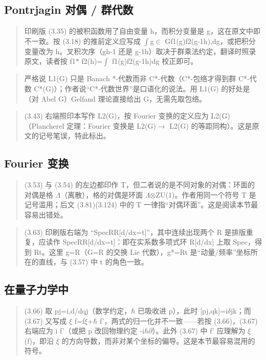 \subsection*{Pontrjagin 对偶 / 群代数}
\begin{quote}\small
印刷版 (3.35) 的被积函数用了自由变量 h，而积分变量是 g，这在原文中即不一致。按 (3.18) 的推前定义应写成 $\int$g$\in$ Gf1(g)f2(g-1h),dg，或把积分变量改为 h。叉积次序（gh-1 还是 g-1h）取决于群乘法约定，翻译时照录原文，读者按 f1$\ast$ f2(h)=$\int$ f1(g)f2(g-1h)dg 校正即可。
\end{quote}

\begin{quote}\small
严格说 L1(G) 只是 Banach *-代数而非 C*-代数（C*-包络才得到群 C*-代数 C*(G)）；作者说“C*-代数世界”是口语化的说法。用 L1(G) 的好处是（对 Abel G）Gelfand 理论直接给出 G，无需先取包络。
\end{quote}

\begin{quote}\small
(3.43) 右端照印本写作 L2(G)，按 Fourier 变换的定义应为 L2(G)（Plancherel 定理：Fourier 变换是 L2(G)$\to$ L2(G) 的等距同构）。这是原文的记号笔误，特此标出。
\end{quote}

\subsection*{Fourier 变换}
\begin{quote}\small
(3.53) 与 (3.54) 的左边都印作 T，但二者说的是不同对象的对偶：环面的对偶是格 $\Lambda$（离散），格的对偶是环面 $\Lambda$$\otimes$ZU(1)。作者用同一个符号 T 是记号滥用；后文 (3.81)(3.124) 中的 T 一律指“对偶环面”。这是阅读本节最容易出错处。
\end{quote}

\begin{quote}\small
(3.63) 印刷版右端为 “SpecRR[d/dx=t]”，其中连续出现两个 R 是排版重复，应读作 SpecRR[d/dx=t]：即在实系数多项式环 R[d/dx] 上取 Spec，得到 Rt。这里 g=R（G=R 的交换 Lie 代数），g*=Rt 是“动量/频率”坐标所在的直线，与 (3.57) 中 t 的角色一致。
\end{quote}

\subsection*{在量子力学中}
\begin{quote}\small
(3.66) 取 pj=i,d/dqj（数学约定，$\hbar$ 已吸收进 p），此时 [pj,qk]=i$\delta$jk；而 (3.67) 又写成 $\xi$ f=f$\xi$+$\hbar$ f'，两式的归一化并不一致——若按 (3.66)，(3.67) 右端应为 i f'（或把 p 改回物理约定 -i$\hbar$$\partial$）。此外 (3.67) 中 f' 应理解为 $\xi$(f)，即沿 $\xi$ 的方向导数，而非对某个坐标的偏导。这是本节最容易混用的符号。
\end{quote}

